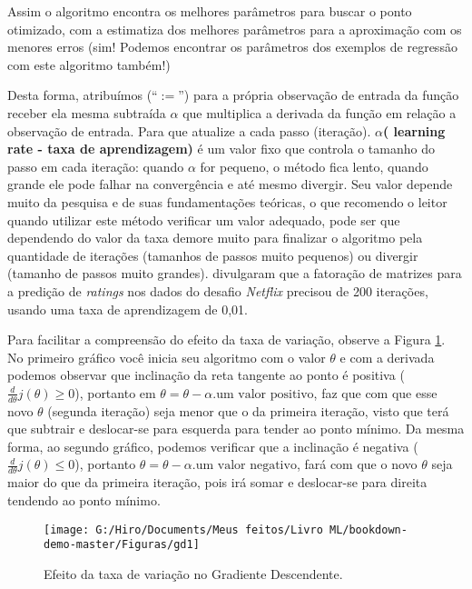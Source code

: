 \documentclass[
  openany]{book}
\begin{document}
Assim o algoritmo encontra os melhores parâmetros para buscar o ponto otimizado, com a estimatiza dos melhores parâmetros para a aproximação com os menores erros (sim! Podemos encontrar os parâmetros dos exemplos de regressão com este algoritmo também!)

Desta forma, atribuímos (``\(:=\)'') para a própria observação de entrada da função receber ela mesma subtraída \(\alpha\) que multiplica a derivada da função em relação a observação de entrada. Para que atualize a cada passo (iteração). \textbf{\(\alpha\)( learning rate - taxa de aprendizagem)} é um valor fixo que controla o tamanho do passo em cada iteração: quando \(\alpha\) for pequeno, o método fica lento, quando grande ele pode falhar na convergência e até mesmo divergir. Seu valor depende muito da pesquisa e de suas fundamentações teóricas, o que recomendo o leitor quando utilizar este método verificar um valor adequado, pode ser que dependendo do valor da taxa demore muito para finalizar o algoritmo pela quantidade de iterações (tamanhos de passos muito pequenos) ou divergir (tamanho de passos muito grandes). \citet{rendle2008online} divulgaram que a fatoração de matrizes para a predição de \emph{ratings} nos dados do desafio \emph{Netflix} precisou de 200 iterações, usando uma taxa de aprendizagem de 0,01.

Para facilitar a compreensão do efeito da taxa de variação, observe a Figura \ref{fig:gd1}. No primeiro gráfico você inicia seu algoritmo com o valor \(\theta\) e com a derivada podemos observar que inclinação da reta tangente ao ponto é positiva (\(\frac{d}{d\theta}j(\theta)\geq 0\)), portanto em \(\theta=\theta-\alpha.\mbox{um valor positivo}\), faz que com que esse novo \(\theta\) (segunda iteração) seja menor que o da primeira iteração, visto que terá que subtrair e deslocar-se para esquerda para tender ao ponto mínimo. Da mesma forma, ao segundo gráfico, podemos verificar que a inclinação é negativa (\(\frac{d}{d\theta}j(\theta)\leq 0\)), portanto \(\theta=\theta-\alpha.\mbox{um valor negativo}\), fará com que o novo \(\theta\) seja maior do que da primeira iteração, pois irá somar e deslocar-se para direita tendendo ao ponto mínimo.

\begin{figure}

{\centering \texttt{[image: G:/Hiro/Documents/Meus feitos/Livro ML/bookdown-demo-master/Figuras/gd1]} 

}

\caption{Efeito da taxa de variação no Gradiente Descendente.}\label{fig:gd1}
\end{figure}
\end{document}
